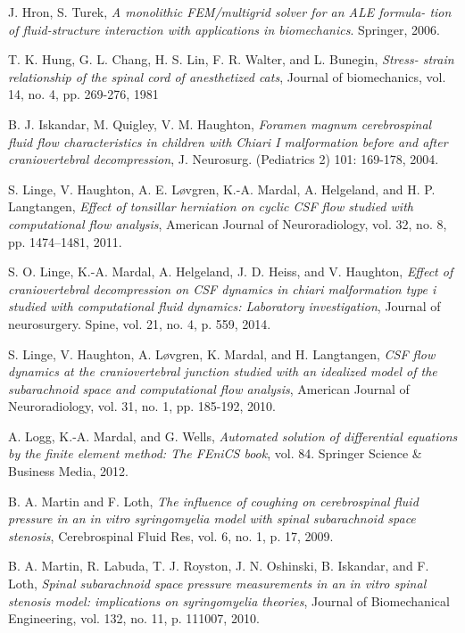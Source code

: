 \documentclass[a4paper,11pt,oneside]{book}
\begin{document}
\begin{thebibliography}{100}
 J. Hron, S. Turek, \emph{A monolithic FEM/multigrid solver for an ALE formula- tion of fluid-structure interaction with applications in biomechanics}. Springer, 2006.

 T. K. Hung, G. L. Chang, H. S. Lin, F. R. Walter, and L. Bunegin, \emph{Stress- strain relationship of the spinal cord of anesthetized cats}, Journal of biomechanics, vol. 14, no. 4, pp. 269-276, 1981

 B. J. Iskandar, M. Quigley, V. M. Haughton, \emph{Foramen magnum cerebrospinal fluid flow characteristics in children with Chiari I malformation before and after craniovertebral decompression}, J. Neurosurg. (Pediatrics 2) 101: 169-178, 2004.


  S. Linge, V. Haughton, A. E. Løvgren, K.-A. Mardal, A. Helgeland, and H. P. Langtangen, \emph{Effect of tonsillar herniation on cyclic CSF flow studied with computational flow analysis}, American Journal of Neuroradiology, vol. 32, no. 8, pp. 1474–1481, 2011.

 S. O. Linge, K.-A. Mardal, A. Helgeland, J. D. Heiss, and V. Haughton, \emph{Effect of craniovertebral decompression on CSF dynamics in chiari malformation type i studied with computational fluid dynamics: Laboratory investigation}, Journal of neurosurgery. Spine, vol. 21, no. 4, p. 559, 2014.

 S. Linge, V. Haughton, A. Løvgren, K. Mardal, and H. Langtangen, \emph{CSF flow dynamics at the craniovertebral junction studied with an idealized model of the subarachnoid space and computational flow analysis}, American Journal of Neuroradiology, vol. 31, no. 1, pp. 185-192, 2010.


 A. Logg, K.-A. Mardal, and G. Wells, \emph{Automated solution of differential equations by the finite element method: The FEniCS book}, vol. 84. Springer Science \& Business Media, 2012.


 B. A. Martin and F. Loth, \emph{The influence of coughing on cerebrospinal fluid pressure in an in vitro syringomyelia model with spinal subarachnoid space stenosis}, Cerebrospinal Fluid Res, vol. 6, no. 1, p. 17, 2009.

 B. A. Martin, R. Labuda, T. J. Royston, J. N. Oshinski, B. Iskandar, and F. Loth, \emph{Spinal subarachnoid space pressure measurements in an in vitro spinal stenosis model: implications on syringomyelia theories}, Journal of Biomechanical Engineering, vol. 132, no. 11, p. 111007, 2010.


\end{thebibliography}
\end{document}
